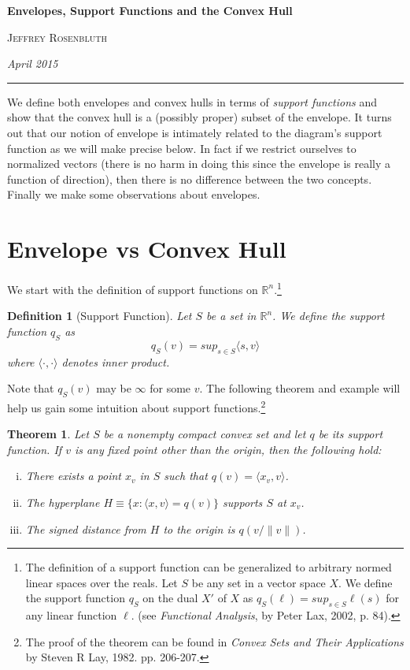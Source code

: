 \documentclass[11pt]{amsart}
\newtheorem{defn}{Definition}
\newtheorem{thm}{Theorem}
\begin{document}
\begin{center}
\bigskip 
\textbf{Envelopes, Support Functions and the Convex Hull}

\textsc{Jeffrey Rosenbluth}

\textit{April 2015}
\end{center}
\hrule
\vspace{0.25in}

We define both envelopes and convex hulls in terms of \emph{support functions} and show
that the convex hull is a (possibly proper) subset of the envelope. It turns out that our notion of
envelope is intimately related to the diagram's support function as we will make precise below.
In fact if we restrict ourselves to normalized vectors (there is no harm in doing this since the envelope
is really a function of direction), then there is no difference between the two concepts.
Finally we make some observations about envelopes. 

\section{Envelope vs Convex Hull}

We start with the definition of support functions
on  $\mathbb{R}^n$.\footnote{
The definition of a support function can be generalized to arbitrary normed linear spaces over the reals.
Let $S$ be any set in a vector space $X$. We define the support function $q_S$ on the dual $X'$ of $X$ as 
$q_S(\ell) = sup_{s \in S} \ell(s)$
for any linear function $\ell.$ 
(see \emph{Functional Analysis}, by Peter Lax, 2002, p. 84).
}
\begin{defn}[Support Function]
\label{supportfunc}
Let $S$ be a set in $\mathbb{R}^n$. We define the support function $q_S$ as 
$$q_S(v) = sup_{s \in S} \langle s,v \rangle$$
where $\langle \cdot, \cdot \rangle$ denotes inner product.
\end{defn}

Note that $q_S(v)$ may be $\infty$ for some $v$. The following theorem
and example will help us gain some intuition about support functions.\footnote{The proof of the theorem can
be found in \emph{Convex Sets and Their Applications} by Steven R Lay, 1982. pp. 206-207.} 

\begin{thm}
Let $S$ be a nonempty compact convex set and let $q$ be its support function. If $v$ is any fixed point other
than the origin, then the following hold:
\begin{enumerate}[i.]
\item There exists a point $x_v$ in $S$ such that $q(v)=\langle x_v, v \rangle$.
\item The hyperplane $H \equiv \{x : \langle x, v \rangle = q(v)\}$ supports $S$ at $x_v$.
\item The signed distance from $H$ to the origin is $q(v/\|v\|)$.
\end{enumerate}
\end{thm}
\end{document}
